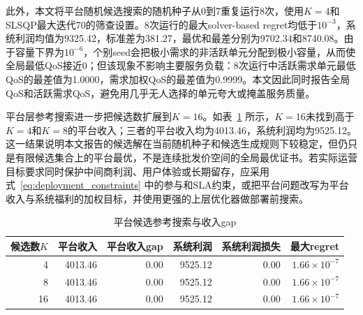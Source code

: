 \documentclass[UTF8,11pt]{ctexart}
\begin{document}
\begin{table}[H]
\centering
\caption{vLLM后端测量QoS曲线下的三层候选结果}
\label{tab:empirical_qos_calibration}
\small
{}
\end{table}

此外，本文将平台随机候选搜索的随机种子从0到7重复运行8次，使用$K=4$和SLSQP最大迭代70的筛查设置。8次运行的最大solver-based regret均低于$10^{-3}$，系统利润均值为9325.42，标准差为381.27，最优和最差分别为9702.34和8740.08。由于容量下界为$10^{-6}$，个别seed会把极小需求的非活跃单元分配到极小容量，从而使全局最低QoS接近0；但该现象不影响主要服务负载：8次运行中活跃需求单元最低QoS的最差值为1.0000，需求加权QoS的最差值为0.9999。本文因此同时报告全局QoS和活跃需求QoS，避免用几乎无人选择的单元夸大或掩盖服务质量。

平台层参考搜索进一步把候选数扩展到$K=16$。如表~\ref{tab:platform_reference_gap} 所示，$K=16$未找到高于$K=4$和$K=8$的平台收入；三者的平台收入均为4013.46，系统利润均为9525.12。这一结果说明本文报告的候选解在当前随机种子和候选生成规则下较稳定，但仍只是有限候选集合上的平台最优，不是连续批发价空间的全局最优证书。若实际运营目标要求同时保护中间商利润、用户体验或长期留存，应采用式~\eqref{eq:deployment_constraints} 中的参与和SLA约束，或把平台问题改写为平台收入与系统福利的加权目标，并使用更强的上层优化器做部署前搜索。

\begin{table}[H]
\centering
\caption{平台候选参考搜索与收入gap}
\label{tab:platform_reference_gap}
\small
\begin{tabular}{rrrrrr}
\toprule
候选数$K$ & 平台收入 & 平台收入gap & 系统利润 & 系统利润损失 & 最大regret \\
\midrule
4 & 4013.46 & 0.00 & 9525.12 & 0.00 & $1.66\times10^{-7}$ \\
8 & 4013.46 & 0.00 & 9525.12 & 0.00 & $1.66\times10^{-7}$ \\
16 & 4013.46 & 0.00 & 9525.12 & 0.00 & $1.66\times10^{-7}$ \\
\bottomrule
\end{tabular}
\end{table}
\end{document}
